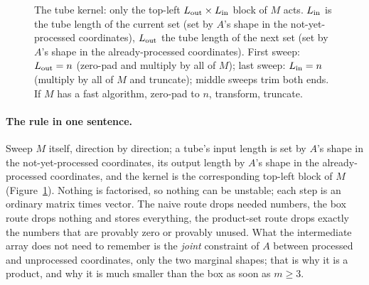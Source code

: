 \documentclass[11pt]{article}
\begin{document}
\begin{figure}[ht]\centering
{}
\caption{The tube kernel: only the top-left $L_{\rm out}\times L_{\rm in}$ block of $M$ acts. $L_{\rm in}$ is the tube length of the
current set (set by $A$'s shape in the not-yet-processed coordinates), $L_{\rm out}$ the tube length of the next set (set by $A$'s
shape in the already-processed coordinates). First sweep: $L_{\rm out}=n$ (zero-pad and multiply by all of $M$); last sweep:
$L_{\rm in}=n$ (multiply by all of $M$ and truncate); middle sweeps trim both ends. If $M$ has a fast algorithm, zero-pad to $n$,
transform, truncate.}\label{fig:kernel}
\end{figure}

\paragraph{The rule in one sentence.} Sweep $M$ itself, direction by direction; a tube's input length is set by $A$'s
shape in the not-yet-processed coordinates, its output length by $A$'s shape in the already-processed coordinates,
and the kernel is the corresponding top-left block of $M$ (Figure~\ref{fig:kernel}). Nothing is factorised, so nothing
can be unstable; each step is an ordinary matrix times vector. The naive route drops needed numbers, the box route
drops nothing and stores everything, the product-set route drops exactly the numbers that are provably zero or
provably unused. What the intermediate array does not need to remember is the \emph{joint} constraint of $A$ between
processed and unprocessed coordinates, only the two marginal shapes; that is why it is a product, and why it is much
smaller than the box as soon as $m\ge3$.
\end{document}
